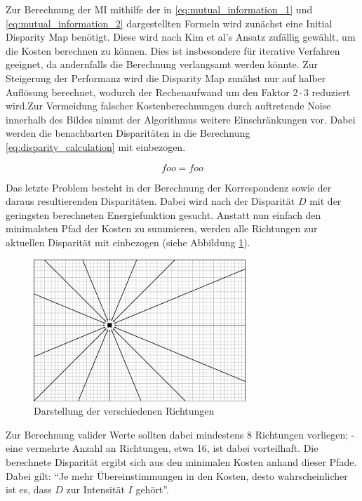 \noindent
Zur Berechnung der MI mithilfe der in \ref{eq:mutual_information_1} und \ref{eq:mutual_information_2} dargestellten Formeln wird zunächst eine Initial Disparity Map benötigt. Diese wird nach Kim et al’s \cite{zureiki2008stereo} Ansatz zufällig gewählt, um die Kosten berechnen zu können. Dies ist insbesondere für iterative Verfahren geeignet, da andernfalls die Berechnung verlangsamt werden könnte. Zur Steigerung der Performanz wird die Disparity Map zunähst nur auf halber Auflösung berechnet,  wodurch der Rechenaufwand um den Faktor $2 \cdot 3$ reduziert wird.Zur Vermeidung falscher Kostenberechnungen durch auftretende Noise innerhalb des Bildes nimmt der Algorithmus weitere Einschränkungen vor. Dabei werden die benachbarten Disparitäten in die Berechnung \ref{eq:disparity_calculation} mit einbezogen.

\begin{equation}\label{eq:disparity_calculation}
 foo = foo
\end{equation}

\noindent
Das letzte Problem besteht in der Berechnung der Korrespondenz sowie der daraus resultierenden Disparitäten. Dabei wird nach der Disparität $D$ mit der geringsten berechneten Energiefunktion gesucht. Anstatt nun einfach den minimalsten Pfad der Kosten zu summieren, werden alle Richtungen zur aktuellen Disparität mit einbezogen (siehe Abbildung \ref{fig:sgm_directions}).

\begin{figure}[h]
	\begin{center}
		\includegraphics[width=8cm]{img/sgm_directions.pdf}
	\end{center}
	\caption{Darstellung der verschiedenen Richtungen}
	\label{fig:sgm_directions}
\end{figure}

\noindent
Zur Berechnung valider Werte sollten dabei mindestens 8 Richtungen vorliegen; -  eine vermehrte Anzahl an Richtungen, etwa 16, ist dabei vorteilhaft. Die berechnete Disparität ergibt sich aus den minimalen Kosten anhand dieser Pfade. Dabei gilt: “Je mehr Übereinstimmungen in den Kosten, desto wahrscheinlicher ist es, dass $D$ zur Intensität $I$ gehört”.\\

